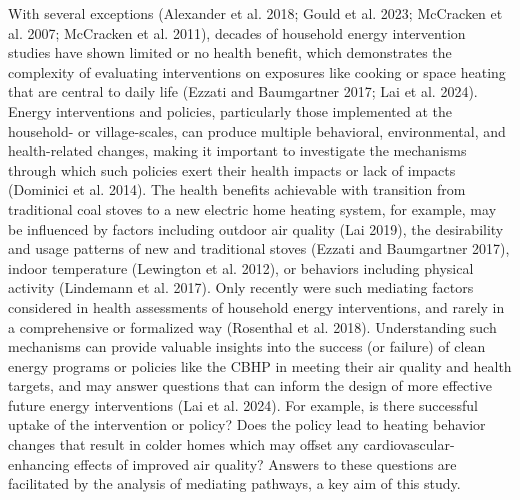 \documentclass[
  letterpaper,
  DIV=11,
  numbers=noendperiod]{scrartcl}
\providecommand{\DIFadd}[1]{{\protect\color{blue}\uwave{#1}}} %
\providecommand{\DIFaddbegin}{} %
\providecommand{\DIFaddend}{} %
\providecommand{\DIFdelbegin}{} %
\providecommand{\DIFdelend}{} %
\newcommand{\DIFscaledelfig}{0.5}
\newlength{\DIFdelgraphicswidth} %
\newlength{\DIFdelgraphicsheight} %
\newcommand{\DIFaddincludegraphics}[2][]{{\color{blue}\fbox{\DIFOincludegraphics[#1]{#2}}}} %
\newcommand{\DIFdelincludegraphics}[2][]{%
\sbox{\DIFdelgraphicsbox}{\DIFOincludegraphics[#1]{#2}}%
\settoboxwidth{\DIFdelgraphicswidth}{\DIFdelgraphicsbox} %
\settoboxtotalheight{\DIFdelgraphicsheight}{\DIFdelgraphicsbox} %
\scalebox{\DIFscaledelfig}{%
\parbox[b]{\DIFdelgraphicswidth}{\usebox{\DIFdelgraphicsbox}\\[-\baselineskip] \rule{\DIFdelgraphicswidth}{0em}}\llap{\resizebox{\DIFdelgraphicswidth}{\DIFdelgraphicsheight}{%
\setlength{\unitlength}{\DIFdelgraphicswidth}%
\begin{picture}(1,1)%
\thicklines\linethickness{2pt} %
{\color[rgb]{1,0,0}\put(0,0){\framebox(1,1){}}}%
{\color[rgb]{1,0,0}\put(0,0){\line( 1,1){1}}}%
{\color[rgb]{1,0,0}\put(0,1){\line(1,-1){1}}}%
\end{picture}%
}\hspace*{3pt}}} %
} %
\DeclareRobustCommand{\DIFaddbegin}{\DIFOaddbegin \let\includegraphics\DIFaddincludegraphics} %
\DeclareRobustCommand{\DIFaddend}{\DIFOaddend \let\includegraphics\DIFOincludegraphics} %
\DeclareRobustCommand{\DIFdelbegin}{\DIFOdelbegin \let\includegraphics\DIFdelincludegraphics} %
\DeclareRobustCommand{\DIFdelend}{\DIFOaddend \let\includegraphics\DIFOincludegraphics} %
\begin{document}
With several exceptions (Alexander et al. 2018; Gould et al. 2023;
McCracken et al. 2007; McCracken et al. 2011), decades of household
energy intervention studies have shown limited or no health benefit,
which demonstrates the complexity of evaluating interventions on
exposures like cooking or space heating that are central to daily life
(Ezzati and Baumgartner 2017; Lai et al. 2024). Energy interventions and
policies, particularly those implemented at the household- or
village-scales, can produce multiple behavioral, environmental, and
health-related changes, making it important to investigate the
mechanisms through which such policies exert their health impacts or
lack of impacts (Dominici et al. 2014). The health benefits achievable
with transition from traditional coal stoves to a new electric home
heating system, for example, may be influenced by factors including
outdoor air quality (Lai 2019), the desirability and usage patterns of
new and traditional stoves (Ezzati and Baumgartner 2017), indoor
temperature (Lewington et al. 2012), or behaviors including physical
activity (Lindemann et al. 2017). Only recently were such mediating
factors considered in health assessments of household energy
interventions, and rarely in a comprehensive or formalized way
(Rosenthal et al. 2018). Understanding such mechanisms can provide
valuable insights into the success (or failure) of clean energy programs
or policies like the CBHP in meeting their air quality and health
targets, and may answer questions that can inform the design of more
effective future energy interventions (Lai et al. 2024). For example, is
there successful uptake of the intervention or policy? Does the policy
lead to heating behavior changes that result in colder homes which may
offset any cardiovascular-enhancing effects of improved air quality?
Answers to these questions are facilitated by the analysis of mediating
pathways, a key aim of this study.

\DIFdelbegin %
\DIFdelend \DIFaddbegin \section{\DIFadd{Specific Aims and Overarching
Approach}}\label{specific-aims-and-overarching-approach}
\DIFaddend 
\end{document}
